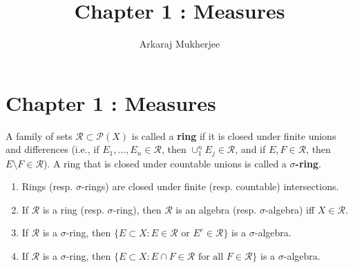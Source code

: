 \documentclass[12pt,a4paper]{article}
\title{\textbf{Chapter 1 : Measures}}
\author{Arkaraj Mukherjee}
\begin{document}
\maketitle
\newpage
\tableofcontents
\newpage
\section{Chapter 1 : Measures}
\begin{problem}\label{prob:1-1}
A family of sets $\mathcal{R} \subset \mathcal{P}(X)$ is called a \textbf{ring} if it is closed under finite unions and differences (i.e., if $E_1, \dots, E_n \in \mathcal{R}$, then $\cup_{1}^{n} E_j \in \mathcal{R}$, and if $E, F \in \mathcal{R}$, then $E \setminus F \in \mathcal{R}$). A ring that is closed under countable unions is called a \textbf{$\sigma$-ring}.
\begin{enumerate}[label=\alph*.]
    \item Rings (resp. $\sigma$-rings) are closed under finite (resp. countable) intersections.
    \item If $\mathcal{R}$ is a ring (resp. $\sigma$-ring), then $\mathcal{R}$ is an algebra (resp. $\sigma$-algebra) iff $X \in \mathcal{R}$.
    \item If $\mathcal{R}$ is a $\sigma$-ring, then $\{E \subset X : E \in \mathcal{R} \text{ or } E^c \in \mathcal{R}\}$ is a $\sigma$-algebra.
    \item If $\mathcal{R}$ is a $\sigma$-ring, then $\{E \subset X : E \cap F \in \mathcal{R} \text{ for all } F \in \mathcal{R}\}$ is a $\sigma$-algebra.
\end{enumerate}
\end{problem}
\end{document}
